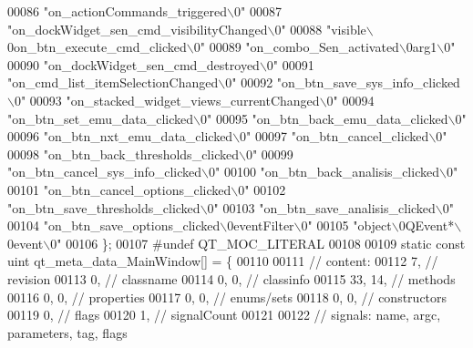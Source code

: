 \begin{DoxyCode}
00086     \textcolor{stringliteral}{"on\_actionCommands\_triggered\(\backslash\)0"}
00087     \textcolor{stringliteral}{"on\_dockWidget\_sen\_cmd\_visibilityChanged\(\backslash\)0"}
00088     \textcolor{stringliteral}{"visible\(\backslash\)0on\_btn\_execute\_cmd\_clicked\(\backslash\)0"}
00089     \textcolor{stringliteral}{"on\_combo\_Sen\_activated\(\backslash\)0arg1\(\backslash\)0"}
00090     \textcolor{stringliteral}{"on\_dockWidget\_sen\_cmd\_destroyed\(\backslash\)0"}
00091     \textcolor{stringliteral}{"on\_cmd\_list\_itemSelectionChanged\(\backslash\)0"}
00092     \textcolor{stringliteral}{"on\_btn\_save\_sys\_info\_clicked\(\backslash\)0"}
00093     \textcolor{stringliteral}{"on\_stacked\_widget\_views\_currentChanged\(\backslash\)0"}
00094     \textcolor{stringliteral}{"on\_btn\_set\_emu\_data\_clicked\(\backslash\)0"}
00095     \textcolor{stringliteral}{"on\_btn\_back\_emu\_data\_clicked\(\backslash\)0"}
00096     \textcolor{stringliteral}{"on\_btn\_nxt\_emu\_data\_clicked\(\backslash\)0"}
00097     \textcolor{stringliteral}{"on\_btn\_cancel\_clicked\(\backslash\)0"}
00098     \textcolor{stringliteral}{"on\_btn\_back\_thresholds\_clicked\(\backslash\)0"}
00099     \textcolor{stringliteral}{"on\_btn\_cancel\_sys\_info\_clicked\(\backslash\)0"}
00100     \textcolor{stringliteral}{"on\_btn\_back\_analisis\_clicked\(\backslash\)0"}
00101     \textcolor{stringliteral}{"on\_btn\_cancel\_options\_clicked\(\backslash\)0"}
00102     \textcolor{stringliteral}{"on\_btn\_save\_thresholds\_clicked\(\backslash\)0"}
00103     \textcolor{stringliteral}{"on\_btn\_save\_analisis\_clicked\(\backslash\)0"}
00104     \textcolor{stringliteral}{"on\_btn\_save\_options\_clicked\(\backslash\)0eventFilter\(\backslash\)0"}
00105     \textcolor{stringliteral}{"object\(\backslash\)0QEvent*\(\backslash\)0event\(\backslash\)0"}
00106 \};
00107 \textcolor{preprocessor}{#undef QT\_MOC\_LITERAL}
00108 
00109 \textcolor{keyword}{static} \textcolor{keyword}{const} uint qt\_meta\_data\_MainWindow[] = \{
00110 
00111  \textcolor{comment}{// content:}
00112        7,       \textcolor{comment}{// revision}
00113        0,       \textcolor{comment}{// classname}
00114        0,    0, \textcolor{comment}{// classinfo}
00115       33,   14, \textcolor{comment}{// methods}
00116        0,    0, \textcolor{comment}{// properties}
00117        0,    0, \textcolor{comment}{// enums/sets}
00118        0,    0, \textcolor{comment}{// constructors}
00119        0,       \textcolor{comment}{// flags}
00120        1,       \textcolor{comment}{// signalCount}
00121 
00122  \textcolor{comment}{// signals: name, argc, parameters, tag, flags}

\end{DoxyCode}
